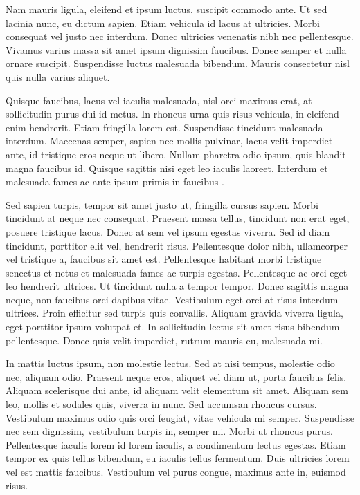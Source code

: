 \documentclass[11pt,oneside,openright]{book}
\begin{document}
Nam mauris ligula, eleifend et ipsum luctus, suscipit commodo ante\cite{6088955}. Ut sed lacinia nunc, eu dictum sapien. Etiam vehicula id lacus at ultricies. Morbi consequat vel justo nec interdum. Donec ultricies venenatis nibh nec pellentesque. Vivamus varius massa sit amet ipsum dignissim faucibus. Donec semper et nulla ornare suscipit. Suspendisse luctus malesuada bibendum. Mauris consectetur nisl quis nulla varius aliquet.

Quisque faucibus, lacus vel iaculis malesuada, nisl orci maximus erat, at sollicitudin purus dui id metus. In rhoncus urna quis risus vehicula, in eleifend enim hendrerit. Etiam fringilla lorem est. Suspendisse tincidunt malesuada interdum. Maecenas semper, sapien nec mollis pulvinar, lacus velit imperdiet ante, id tristique eros neque ut libero. Nullam pharetra odio ipsum, quis blandit magna faucibus id. Quisque sagittis nisi eget leo iaculis laoreet. Interdum et malesuada fames ac ante ipsum primis in faucibus \cite{benzie2007survey}.

Sed sapien turpis, tempor sit amet justo ut, fringilla cursus sapien. Morbi tincidunt at neque nec consequat. Praesent massa tellus, tincidunt non erat eget, posuere tristique lacus. Donec at sem vel ipsum egestas viverra. Sed id diam tincidunt, porttitor elit vel, hendrerit risus. Pellentesque dolor nibh, ullamcorper vel tristique a, faucibus sit amet est. Pellentesque habitant morbi tristique senectus et netus et malesuada fames ac turpis egestas. Pellentesque ac orci eget leo hendrerit ultrices. Ut tincidunt nulla a tempor tempor. Donec sagittis magna neque, non faucibus orci dapibus vitae. Vestibulum eget orci at risus interdum ultrices. Proin efficitur sed turpis quis convallis. Aliquam gravida viverra ligula, eget porttitor ipsum volutpat et. In sollicitudin lectus sit amet risus bibendum pellentesque. Donec quis velit imperdiet, rutrum mauris eu, malesuada mi.

In mattis luctus ipsum, non molestie lectus. Sed at nisi tempus, molestie odio nec, aliquam odio. Praesent neque eros, aliquet vel diam ut, porta faucibus felis. Aliquam scelerisque dui ante, id aliquam velit elementum sit amet. Aliquam sem leo, mollis et sodales quis, viverra in nunc. Sed accumsan rhoncus cursus. Vestibulum maximus odio quis orci feugiat, vitae vehicula mi semper. Suspendisse nec sem dignissim, vestibulum turpis in, semper mi. Morbi ut rhoncus purus. Pellentesque iaculis lorem id lorem iaculis, a condimentum lectus egestas. Etiam tempor ex quis tellus bibendum, eu iaculis tellus fermentum. Duis ultricies lorem vel est mattis faucibus. Vestibulum vel purus congue, maximus ante in, euismod risus.
\end{document}
